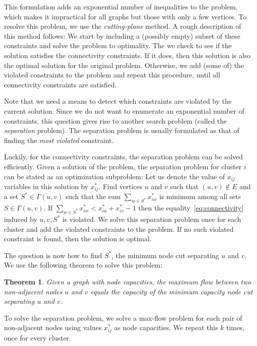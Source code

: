 \documentclass[]{article}
\newtheorem{theorem}{Theorem}
\begin{document}
This formulation adds an exponential number of inequalities to the
problem, which makes it impractical for all graphs but those with only a
few vertices. To resolve this problem, we use the \emph{cutting-plane}
method. A rough description of this method follows: We start by
including a (possibly empty) subset of these constraints and solve the
problem to optimality. The we check to see if the solution satisfies the
connectivity constraints. If it does, then this solution is also the
optimal solution for the original problem. Otherwise, we add (some of)
the violated constraints to the problem and repeat this procedure, until
all connectivity constraints are satisfied.

Note that we need a means to detect which constraints are violated by
the current solution. Since we do not want to enumerate an exponential
number of constraints, this question gives rise to another search
problem (called the \emph{separation} problem). The separation problem
is usually formulated as that of finding the \emph{most violated}
constraint.

Luckily, for the connectivity constraints, the separation problem can be
solved efficiently. Given a solution of the problem, the
separation problem for cluster $i$ can be stated as an optimization subproblem: Let us denote the value of $x_{ij}$ variables in this solution by $x^*_{ij}$. Find vertices $u$ and $v$ such that $(u, v) \notin E$ and a set $S^* \in \Gamma(u, v)$ such that the sum $\sum_{w \in S^*} x_{iw}^*$ is
minimum among all sets $S \in \Gamma(u, v)$. If $\sum_{w \in S^*} x_{iw}^* < x^*_{iu} + x^*_{iv} - 1$ then the equality~\ref{eq:connectivity}
induced by $u, v, S^*$ is violated. We solve this separation problem
once for each cluster and add the violated constraints to the problem.
If no such violated constraint is found, then the solution is optimal.

The question is now how to find $S^*$, the minimum node cut separating
$u$ and $v$. We use the following theorem to solve this problem:

\begin{theorem}
Given a graph with node capacities, the maximum flow between
two non-adjacent nodes $u$ and $v$ equals the capacity of the minimum
capacity node cut separating $u$ and $v$.
\end{theorem}

To solve the separation problem, we solve a max-flow problem for each
pair of non-adjacent nodes using values $x^*_{ij}$ as node capacities. We repeat this $k$ times, once for every cluster.
\end{document}
